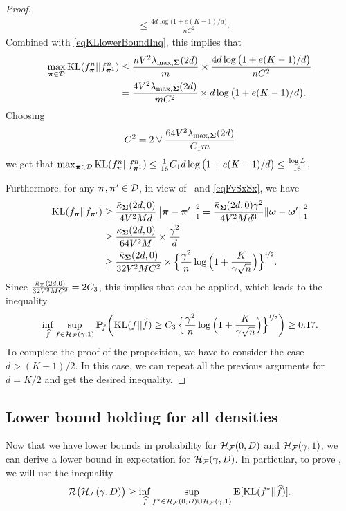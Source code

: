 \begin{proof}
\begin{align}
	&\leq \frac{4d\log\big(1+e(K-1)/d\big)}{nC^2}.
	\end{align}
	Combined with \cref{eqKLlowerBoundInq}, this implies that
	\begin{align}
	\max_{\boldsymbol \pi\in\mathcal D}{\rm KL}(f^n_{\boldsymbol \pi}||f^n_{\boldsymbol \pi^1})
	&\leq \frac{nV^2\lambda_{\max,\boldsymbol\Sigma}(2d)}{m}\times \frac{4d\log\big(1+e(K-1)/d\big)}{nC^2}\\
	&= \frac{4V^2\lambda_{\max,\boldsymbol\Sigma}(2d)}{m C^2}\times {d\log\big(1+e(K-1)/d\big)}.
	\end{align}
	Choosing%
	$$
	C^2 = 2\vee\frac{64 V^2\lambda_{\max,\boldsymbol\Sigma}(2d)}{C_1 m}
	$$
	we get that $\max_{\boldsymbol \pi\in\mathcal D}{\rm KL}(f^n_{\boldsymbol \pi}||f^n_{\boldsymbol \pi^1})\le \frac1{16} C_1{d\log\big(1+e(K-1)/d\big)}\le
	\frac{\log L}{16}$.
	
	Furthermore, for any $\boldsymbol \pi,\boldsymbol \pi'\in\mathcal D$, in view of~ and \eqref{eqFvSxSx}, we have
	\begin{align}
	{\rm KL}(f_{\boldsymbol \pi} || f_{\boldsymbol \pi'}) &\geq \frac{\bar\kappa_{\boldsymbol\Sigma}(2d,0)}{4V^2M d} \big{\|}\boldsymbol \pi - \boldsymbol \pi'\big{\|}_1^2
	=\frac{\bar\kappa_{\boldsymbol\Sigma}(2d,0)\gamma^2}{4V^2M d^3} \|\boldsymbol \omega - \boldsymbol \omega'\big\|_1^2\\
	&\geq \frac{\bar\kappa_{\boldsymbol\Sigma}(2d,0)}{64V^2M}\times \frac{\gamma^2}{d}\\
	&\geq \frac{\bar\kappa_{\boldsymbol\Sigma}(2d,0)}{32V^2M C^2}\times 
	\Big\{{\frac{\gamma^2}n\log\Big(1+\frac{K}{\gamma\sqrt{n}}\Big)}\Big\}^{\nicefrac12}.
	\end{align}
	Since $\frac{\bar\kappa_{\boldsymbol\Sigma}(2d,0)}{32V^2M C^2} = 2C_3$, this implies that 
	 can be applied, which leads to the inequality
	\begin{equation}
	\inf_{\widehat f}\sup_{f \in \mathcal H_\mathcal F(\gamma,1)}\mathbf P\!_{f}\bigg({\rm KL}(f||\widehat f)\geq
	C_3\,\Big\{{\frac{\gamma^2}n\log\Big(1+\frac{K}{\gamma\sqrt{n}}\Big)}\Big\}^{\nicefrac12}\bigg)\geq 0.17.
	\end{equation}
	To complete the proof of the proposition, we have to consider the case $d > (K-1)/2$. In this case,
	we can repeat all the previous arguments for $d= K/2$ and get the desired inequality.
\end{proof}

\subsection{Lower bound holding for all densities} %

Now that we have lower bounds in probability for $\mathcal H_\mathcal F(0,D)$ and $\mathcal H_\mathcal F(\gamma,1)$, we can derive a lower bound in expectation for
$\mathcal H_\mathcal F(\gamma,D)$. In particular, to prove ,
we will use the inequality
\begin{equation}\label{eqFvSxSev}
\mathcal R\big(\mathcal H_{\mathcal F}(\gamma,D)\big)  \ge \inf_{\widehat f}
\sup_{f^*\in \mathcal H_\mathcal F(0,D)\cup \mathcal H_\mathcal F(\gamma,1)} \mathbf E[{\rm KL}(f^*||\widehat f)].
\end{equation}



